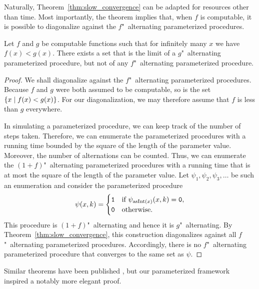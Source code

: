 Naturally, Theorem~\ref{thm:slow_convergence} can be adapted for resources other than time.
Most importantly, the theorem implies that, when $f$ is computable, it is possible to diagonalize against the $f$"~alternating parameterized procedures.
\begin{theorem}
\label{thm:computable_hierarchy}%
  Let $f$ and $g$ be computable functions such that for infinitely many $x$ we have $f(x) < g(x)$.
  There exists a set that is the limit of a $g$"~alternating parameterized procedure, but not of any $f$"~alternating parameterized procedure.
\end{theorem}
\begin{proof}
  We shall diagonalize against the $f$"~alternating parameterized procedures.
  Because $f$ and $g$ were both assumed to be computable, so is the set $\{x \;|\; f(x) < g(x)\}$.
  For our diagonalization, we may therefore assume that $f$ is less than $g$ everywhere.

  In simulating a parameterized procedure, we can keep track of the number of steps taken.
  Therefore, we can enumerate the parameterized procedures with a running time bounded by the square of the length of the parameter value.
  Moreover, the number of alternations can be counted.
  Thus, we can enumerate the $(1 + f)$"~alternating parameterized procedures with a running time that is at most the square of the length of the parameter value.
  Let $\psi_1, \psi_2, \psi_3, \ldots$ be such an enumeration and consider the parameterized procedure
  \begin{equation*}
    \psi(x, k) = \begin{cases}
      \textnormal{\texttt{1}}	&\text{if $\psi_{\operatorname{asInt}(x)}(x, k) = \textnormal{\texttt{0}}$}, \\
      \textnormal{\texttt{0}}	&\text{otherwise}.
    \end{cases}
  \end{equation*}
  This procedure is $(1 + f)$"~alternating and hence it is $g$"~alternating.
  By Theorem~\ref{thm:slow_convergence}, this construction diagonalizes against all $f$"~alternating parameterized procedures.
  Accordingly, there is no $f$"~alternating parameterized procedure that converges to the same set as $\psi$.
\end{proof}

Similar theorems have been published \parencite{epstein1981hierarchies,arslanov1997degree}, but our parameterized framework inspired a notably more elegant proof.

